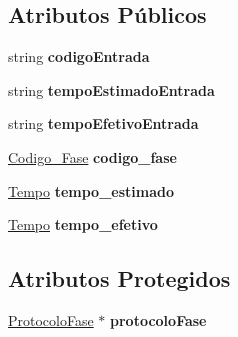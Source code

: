 \subsection*{\-Atributos \-Públicos}
\begin{DoxyCompactItemize}
\item 
\hypertarget{class_cntr_int_fase_a0f718c4e96030b2724ff182b19a5be16}{
string {\bfseries codigo\-Entrada}}
\label{class_cntr_int_fase_a0f718c4e96030b2724ff182b19a5be16}

\item 
\hypertarget{class_cntr_int_fase_a4638da5382a63cdd7688683fa2e2c319}{
string {\bfseries tempo\-Estimado\-Entrada}}
\label{class_cntr_int_fase_a4638da5382a63cdd7688683fa2e2c319}

\item 
\hypertarget{class_cntr_int_fase_a460a13270821111b2216daabb955eba8}{
string {\bfseries tempo\-Efetivo\-Entrada}}
\label{class_cntr_int_fase_a460a13270821111b2216daabb955eba8}

\item 
\hypertarget{class_cntr_int_fase_af6cb3c189d0fc074e878d94900572bb6}{
\hyperlink{class_codigo___fase}{\-Codigo\-\_\-\-Fase} {\bfseries codigo\-\_\-fase}}
\label{class_cntr_int_fase_af6cb3c189d0fc074e878d94900572bb6}

\item 
\hypertarget{class_cntr_int_fase_a382a7f46bed01f2acf3b56c6bc42f917}{
\hyperlink{class_tempo}{\-Tempo} {\bfseries tempo\-\_\-estimado}}
\label{class_cntr_int_fase_a382a7f46bed01f2acf3b56c6bc42f917}

\item 
\hypertarget{class_cntr_int_fase_a4607c62f5939e390212b0907a72ff840}{
\hyperlink{class_tempo}{\-Tempo} {\bfseries tempo\-\_\-efetivo}}
\label{class_cntr_int_fase_a4607c62f5939e390212b0907a72ff840}

\end{DoxyCompactItemize}
\subsection*{\-Atributos \-Protegidos}
\begin{DoxyCompactItemize}
\item 
\hypertarget{class_cntr_int_fase_a26ae222e012957ddeb47c446b0dd2cad}{
\hyperlink{class_protocolo_fase}{\-Protocolo\-Fase} $\ast$ {\bfseries protocolo\-Fase}}
\label{class_cntr_int_fase_a26ae222e012957ddeb47c446b0dd2cad}

\end{DoxyCompactItemize}


